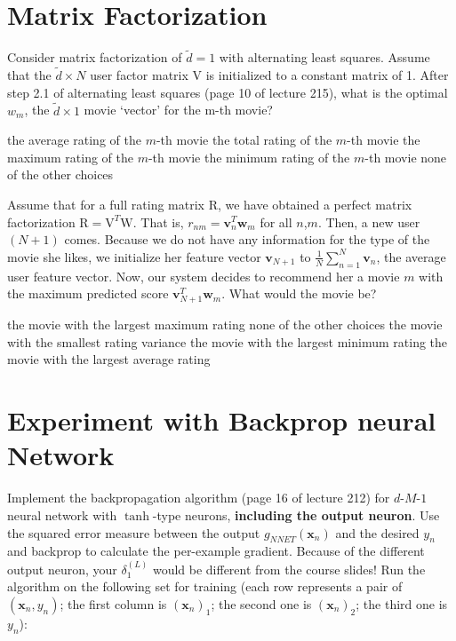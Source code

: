 \documentclass[a4paper,10pt]{exam}
\begin{document}
\begin{questions}
	\section*{Matrix Factorization}
	\question
	Consider matrix factorization of $\tilde{d} = 1$ with alternating least squares. Assume that the $\tilde{d} \times N$ user factor matrix $\mathrm{V}$ is initialized to a constant matrix of 1. After step 2.1 of alternating least squares (page 10 of lecture 215), what is the optimal $w_m$, the $\tilde{d} \times 1$ movie `vector' for the m-th movie?
	\begin{checkboxes}
		\CorrectChoice the average rating of the $m$-th movie
		\choice the total rating of the $m$-th movie
		\choice the maximum rating of the $m$-th movie
		\choice the minimum rating of the $m$-th movie
		\choice none of the other choices\\
	\end{checkboxes}

	\question Assume that for a full rating matrix $\mathrm{R}$, we have obtained a perfect matrix factorization $\mathrm{R} = \mathrm{V}^T \mathrm{W}$. That is, $r_{nm} = \mathbf{v}_n^T \mathbf{w}_m$ for all $n$,$m$. Then, a new user $(N+1)$ comes. Because we do not have any information for the type of the movie she likes, we initialize her feature vector $\mathbf{v}_{N+1}$ to $\frac{1}{N} \sum_{n    =1}^N \mathbf{v}_n$, the average user feature vector. Now, our system decides to recommend her a movie $m$ with the maximum predicted score $\mathbf{v}_{N+1}^T \mathbf{w}_m$. What would the movie be?
	\begin{checkboxes}
		\choice the movie with the largest maximum rating
		\choice none of the other choices
		\choice the movie with the smallest rating variance
		\choice the movie with the largest minimum rating
		\CorrectChoice the movie with the largest average rating\\
	\end{checkboxes}

	\section*{Experiment with Backprop neural Network}

	\question Implement the backpropagation algorithm (page 16 of lecture 212) for $d$-$M$-$1$ neural network with $\tanh$-type neurons, \textbf{including the output neuron}. Use the squared error measure between the output $g_{NNET}(\mathbf{x}_n)$ and the desired $y_n$ and backprop to calculate the per-example gradient. Because of the different output neuron, your $\delta_1^{(L)}$ would be different from the course slides! Run the algorithm on the following set for training (each row represents a pair of $(\mathbf{x}_n, y_n)$; the first column is $(\mathbf{x}_n)_1$; the second one is $(\mathbf{x}_n)_2$; the third one is $y_n$):


\end{questions}
\end{document}
